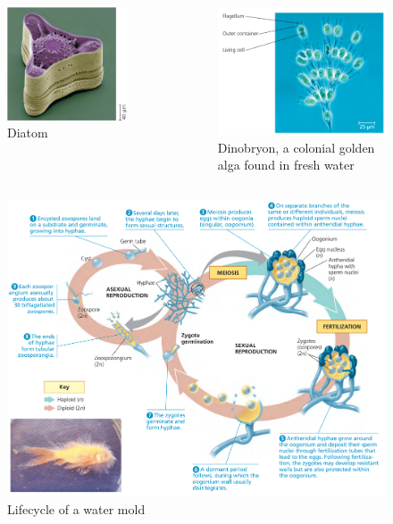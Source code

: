 \documentclass[ignorenonframetext,aspectratio=169]{beamer}
\begin{document}
\begin{frame}{}
\protect\hypertarget{section-19}{}

\begin{columns}[T,onlytextwidth]

\begin{figure}
\includegraphics[width=0.55\linewidth]{./../images/diatom_phytoplankton} \caption{Diatom}\label{fig:stramenopiles-diatom}
\end{figure}

\begin{figure}
\includegraphics[width=0.55\linewidth]{./../images/dinobryon_golden_algae} \caption{Dinobryon, a colonial golden alga found in fresh water}\label{fig:stramenopiles-golden-algae}
\end{figure}
\end{columns}

\end{frame}

\begin{frame}{}
\protect\hypertarget{section-20}{}

\begin{figure}
\includegraphics[width=0.55\linewidth]{./../images/watermold_lifecycle} \caption{Lifecycle of a water mold}\label{fig:lifecycle-oomycete}
\end{figure}

\end{frame}
\end{document}
